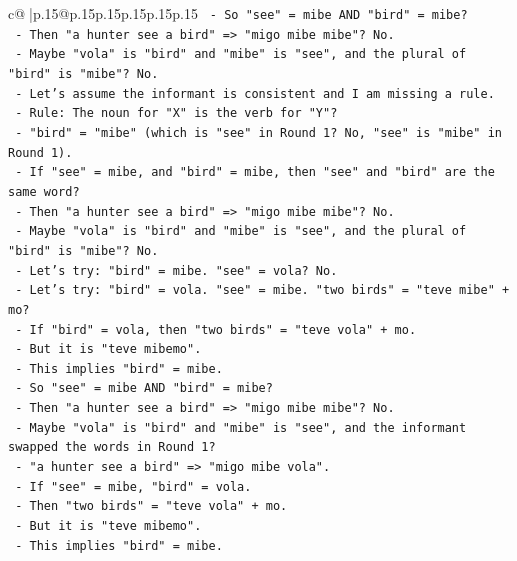 \documentclass{article}
\begin{document}
{\begin{supertabular}{c@{$\;$}|p{.15\linewidth}@{}p{.15\linewidth}p{.15\linewidth}p{.15\linewidth}p{.15\linewidth}p{.15\linewidth}}
{{{\texttt{            {-} So "see" = mibe AND "bird" = mibe?} \\
\texttt{            {-} Then "a hunter see a bird" => "migo mibe mibe"? No.} \\
\texttt{            {-} Maybe "vola" is "bird" and "mibe" is "see", and the plural of "bird" is "mibe"? No.} \\
\texttt{            {-} Let's assume the informant is consistent and I am missing a rule.} \\
\texttt{            {-} Rule: The noun for "X" is the verb for "Y"?} \\
\texttt{              {-} "bird" = "mibe" (which is "see" in Round 1? No, "see" is "mibe" in Round 1).} \\
\texttt{              {-} If "see" = mibe, and "bird" = mibe, then "see" and "bird" are the same word?} \\
\texttt{              {-} Then "a hunter see a bird" => "migo mibe mibe"? No.} \\
\texttt{              {-} Maybe "vola" is "bird" and "mibe" is "see", and the plural of "bird" is "mibe"? No.} \\
\texttt{              {-} Let's try: "bird" = mibe. "see" = vola? No.} \\
\texttt{              {-} Let's try: "bird" = vola. "see" = mibe. "two birds" = "teve mibe" + mo?} \\
\texttt{              {-} If "bird" = vola, then "two birds" = "teve vola" + mo.} \\
\texttt{              {-} But it is "teve mibemo".} \\
\texttt{              {-} This implies "bird" = mibe.} \\
\texttt{              {-} So "see" = mibe AND "bird" = mibe?} \\
\texttt{              {-} Then "a hunter see a bird" => "migo mibe mibe"? No.} \\
\texttt{              {-} Maybe "vola" is "bird" and "mibe" is "see", and the informant swapped the words in Round 1?} \\
\texttt{              {-} "a hunter see a bird" => "migo mibe vola".} \\
\texttt{              {-} If "see" = mibe, "bird" = vola.} \\
\texttt{              {-} Then "two birds" = "teve vola" + mo.} \\
\texttt{              {-} But it is "teve mibemo".} \\
\texttt{              {-} This implies "bird" = mibe.} \\
}}}
\end{supertabular}}
\end{document}
